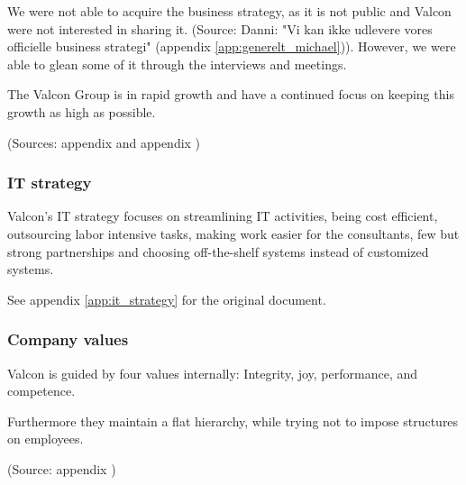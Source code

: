 We were not able to acquire the business strategy, as it is not public and Valcon were not interested in sharing it. (Source: Danni: "Vi kan ikke udlevere vores officielle business strategi" (appendix \ref{app:generelt_michael})). 
However, we were able to glean some of it through the interviews and meetings.

The Valcon Group is in rapid growth and have a continued focus on keeping this growth as high as possible. 

(Sources: appendix  and appendix )

\subsubsection{IT strategy}
Valcon's IT strategy focuses on streamlining IT activities, being cost efficient, outsourcing labor intensive tasks, making work easier for the consultants, few but strong partnerships and choosing off-the-shelf systems instead of customized systems.

See appendix \ref{app:it_strategy} for the original document.

\subsubsection{Company values}
Valcon is guided by four values internally: Integrity, joy, performance, and competence.

Furthermore they maintain a flat hierarchy, while trying not to impose structures on employees. 

(Source: appendix )